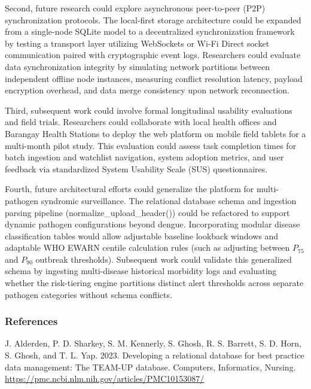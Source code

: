 \documentclass[
]{article}
\begin{document}
Second, future research could explore asynchronous peer-to-peer (P2P)
synchronization protocols. The local-first storage architecture could be
expanded from a single-node SQLite model to a decentralized
synchronization framework by testing a transport layer utilizing
WebSockets or Wi-Fi Direct socket communication paired with
cryptographic event logs. Researchers could evaluate data
synchronization integrity by simulating network partitions between
independent offline node instances, measuring conflict resolution
latency, payload encryption overhead, and data merge consistency upon
network reconnection.

Third, subsequent work could involve formal longitudinal usability
evaluations and field trials. Researchers could collaborate with local
health offices and Barangay Health Stations to deploy the web platform
on mobile field tablets for a multi-month pilot study. This evaluation
could assess task completion times for batch ingestion and watchlist
navigation, system adoption metrics, and user feedback via standardized
System Usability Scale (SUS) questionnaires.

Fourth, future architectural efforts could generalize the platform for
multi-pathogen syndromic surveillance. The relational database schema
and ingestion parsing pipeline (normalize\_upload\_header()) could be
refactored to support dynamic pathogen configurations beyond dengue.
Incorporating modular disease classification tables would allow
adjustable baseline lookback windows and adaptable WHO EWARN centile
calculation rules (such as adjusting between \(P_{75}\) and \(P_{90}\)
outbreak thresholds). Subsequent work could validate this generalized
schema by ingesting multi-disease historical morbidity logs and
evaluating whether the risk-tiering engine partitions distinct alert
thresholds across separate pathogen categories without schema conflicts.

\subsubsection{\texorpdfstring{\textbf{References}}{References}}\label{references}

J. Alderden, P. D. Sharkey, S. M. Kennerly, S. Ghosh, R. S. Barrett, S.
D. Horn, S. Ghosh, and T. L. Yap. 2023. Developing a relational database
for best practice data management: The TEAM-UP database. Computers,
Informatics, Nursing.
\href{https://pmc.ncbi.nlm.nih.gov/articles/PMC10153087/}{\ul{https://pmc.ncbi.nlm.nih.gov/articles/PMC10153087/}}
\end{document}
